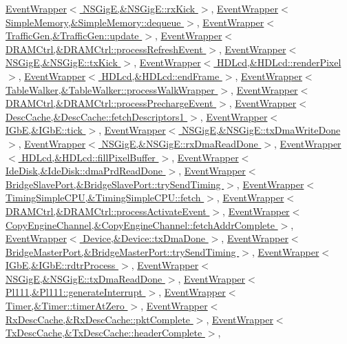 \hyperlink{classEventWrapper_a2bd90422eece9190794479e08092a252}{EventWrapper$<$ NSGigE,\&NSGigE::rxKick $>$}, \hyperlink{classEventWrapper_a2bd90422eece9190794479e08092a252}{EventWrapper$<$ SimpleMemory,\&SimpleMemory::dequeue $>$}, \hyperlink{classEventWrapper_a2bd90422eece9190794479e08092a252}{EventWrapper$<$ TrafficGen,\&TrafficGen::update $>$}, \hyperlink{classEventWrapper_a2bd90422eece9190794479e08092a252}{EventWrapper$<$ DRAMCtrl,\&DRAMCtrl::processRefreshEvent $>$}, \hyperlink{classEventWrapper_a2bd90422eece9190794479e08092a252}{EventWrapper$<$ NSGigE,\&NSGigE::txKick $>$}, \hyperlink{classEventWrapper_a2bd90422eece9190794479e08092a252}{EventWrapper$<$ HDLcd,\&HDLcd::renderPixel $>$}, \hyperlink{classEventWrapper_a2bd90422eece9190794479e08092a252}{EventWrapper$<$ HDLcd,\&HDLcd::endFrame $>$}, \hyperlink{classEventWrapper_a2bd90422eece9190794479e08092a252}{EventWrapper$<$ TableWalker,\&TableWalker::processWalkWrapper $>$}, \hyperlink{classEventWrapper_a2bd90422eece9190794479e08092a252}{EventWrapper$<$ DRAMCtrl,\&DRAMCtrl::processPrechargeEvent $>$}, \hyperlink{classEventWrapper_a2bd90422eece9190794479e08092a252}{EventWrapper$<$ DescCache,\&DescCache::fetchDescriptors1 $>$}, \hyperlink{classEventWrapper_a2bd90422eece9190794479e08092a252}{EventWrapper$<$ IGbE,\&IGbE::tick $>$}, \hyperlink{classEventWrapper_a2bd90422eece9190794479e08092a252}{EventWrapper$<$ NSGigE,\&NSGigE::txDmaWriteDone $>$}, \hyperlink{classEventWrapper_a2bd90422eece9190794479e08092a252}{EventWrapper$<$ NSGigE,\&NSGigE::rxDmaReadDone $>$}, \hyperlink{classEventWrapper_a2bd90422eece9190794479e08092a252}{EventWrapper$<$ HDLcd,\&HDLcd::fillPixelBuffer $>$}, \hyperlink{classEventWrapper_a2bd90422eece9190794479e08092a252}{EventWrapper$<$ IdeDisk,\&IdeDisk::dmaPrdReadDone $>$}, \hyperlink{classEventWrapper_a2bd90422eece9190794479e08092a252}{EventWrapper$<$ BridgeSlavePort,\&BridgeSlavePort::trySendTiming $>$}, \hyperlink{classEventWrapper_a2bd90422eece9190794479e08092a252}{EventWrapper$<$ TimingSimpleCPU,\&TimingSimpleCPU::fetch $>$}, \hyperlink{classEventWrapper_a2bd90422eece9190794479e08092a252}{EventWrapper$<$ DRAMCtrl,\&DRAMCtrl::processActivateEvent $>$}, \hyperlink{classEventWrapper_a2bd90422eece9190794479e08092a252}{EventWrapper$<$ CopyEngineChannel,\&CopyEngineChannel::fetchAddrComplete $>$}, \hyperlink{classEventWrapper_a2bd90422eece9190794479e08092a252}{EventWrapper$<$ Device,\&Device::txDmaDone $>$}, \hyperlink{classEventWrapper_a2bd90422eece9190794479e08092a252}{EventWrapper$<$ BridgeMasterPort,\&BridgeMasterPort::trySendTiming $>$}, \hyperlink{classEventWrapper_a2bd90422eece9190794479e08092a252}{EventWrapper$<$ IGbE,\&IGbE::rdtrProcess $>$}, \hyperlink{classEventWrapper_a2bd90422eece9190794479e08092a252}{EventWrapper$<$ NSGigE,\&NSGigE::txDmaReadDone $>$}, \hyperlink{classEventWrapper_a2bd90422eece9190794479e08092a252}{EventWrapper$<$ Pl111,\&Pl111::generateInterrupt $>$}, \hyperlink{classEventWrapper_a2bd90422eece9190794479e08092a252}{EventWrapper$<$ Timer,\&Timer::timerAtZero $>$}, \hyperlink{classEventWrapper_a2bd90422eece9190794479e08092a252}{EventWrapper$<$ RxDescCache,\&RxDescCache::pktComplete $>$}, \hyperlink{classEventWrapper_a2bd90422eece9190794479e08092a252}{EventWrapper$<$ TxDescCache,\&TxDescCache::headerComplete $>$}, 